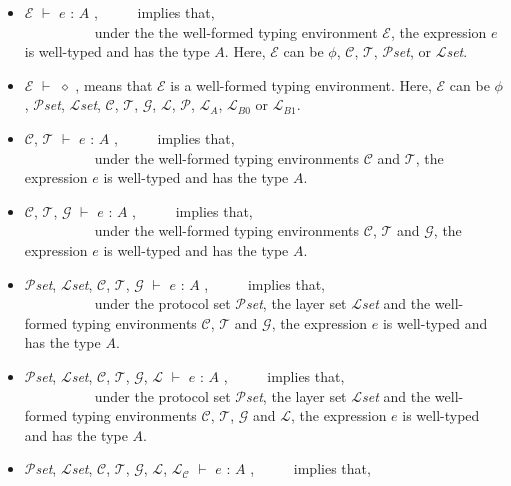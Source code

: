 \documentclass{article}
\begin{document}
\begin{itemize}
  \item $\mathcal{E}$ $\vdash$ $e$ : $A$ , ~~~~~implies that, \\
  ~~~~~~~~~~under the the well-formed typing environment $\mathcal{E}$, the expression $e$ is well-typed and has the type $A$. Here, $\mathcal{E}$ can be $\phi$, $\mathcal{C}$, $\mathcal{T}$, $\mathcal{P}$\textit{set}, or $\mathcal{L}$\textit{set}.
  \item $\mathcal{E}$ $\vdash$ $\diamond$ , means that $\mathcal{E}$ is a well-formed typing environment. Here, $\mathcal{E}$ can be $\phi$, $\mathcal{P}$\textit{set}, $\mathcal{L}$\textit{set}, $\mathcal{C}$, $\mathcal{T}$, $\mathcal{G}$, $\mathcal{L}$, $\mathcal{P}$, $\mathcal{L}_{A}$, $\mathcal{L}_{B0}$ or $\mathcal{L}_{B1}$. 
  \item $\mathcal{C}$, $\mathcal{T}$ $\vdash$ $e$ : $A$ , ~~~~~implies that, \\
  ~~~~~~~~~~under the well-formed typing environments $\mathcal{C}$ and $\mathcal{T}$, the expression $e$ is well-typed and has the type $A$.
  \item $\mathcal{C}$, $\mathcal{T}$, $\mathcal{G}$ $\vdash$ $e$ : $A$ , ~~~~~implies that, \\
  ~~~~~~~~~~under the well-formed typing environments $\mathcal{C}$, $\mathcal{T}$ and $\mathcal{G}$, the expression $e$ is well-typed and has the type $A$.
  \item $\mathcal{P}$\textit{set}, $\mathcal{L}$\textit{set}, $\mathcal{C}$, $\mathcal{T}$, $\mathcal{G}$ $\vdash$ $e$ : $A$ , ~~~~~implies that, \\
  ~~~~~~~~~~under the protocol set $\mathcal{P}$\textit{set}, the layer set $\mathcal{L}$\textit{set} and the well-formed typing environments $\mathcal{C}$, $\mathcal{T}$ and $\mathcal{G}$, the expression $e$ is well-typed and has the type $A$.
  \item $\mathcal{P}$\textit{set}, $\mathcal{L}$\textit{set}, $\mathcal{C}$, $\mathcal{T}$, $\mathcal{G}$, $\mathcal{L}$ $\vdash$ $e$ : $A$ , ~~~~~implies that, \\
  ~~~~~~~~~~under the protocol set $\mathcal{P}$\textit{set}, the layer set $\mathcal{L}$\textit{set} and the well-formed typing environments $\mathcal{C}$, $\mathcal{T}$, $\mathcal{G}$ and $\mathcal{L}$, the expression $e$ is well-typed and has the type $A$.
  \item $\mathcal{P}$\textit{set}, $\mathcal{L}$\textit{set}, $\mathcal{C}$, $\mathcal{T}$, $\mathcal{G}$, $\mathcal{L}$, $\mathcal{L_{C}}$  $\vdash$ $e$ : $A$ , ~~~~~implies that, \\

\end{itemize}
\end{document}
